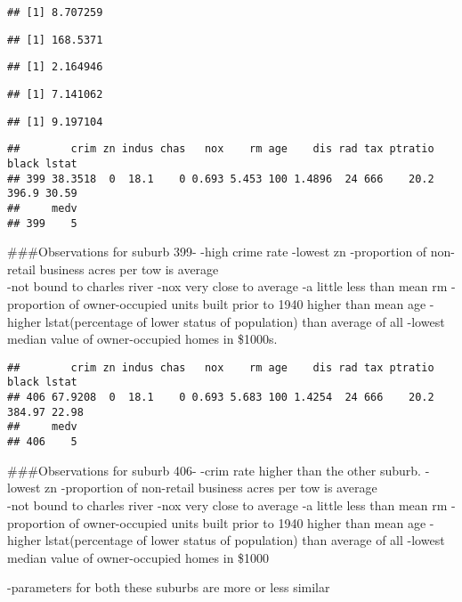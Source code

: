 \documentclass[
]{article}
\begin{document}
\begin{verbatim}
## [1] 8.707259
\end{verbatim}

\begin{verbatim}
## [1] 168.5371
\end{verbatim}

\begin{verbatim}
## [1] 2.164946
\end{verbatim}

\begin{verbatim}
## [1] 7.141062
\end{verbatim}

\begin{verbatim}
## [1] 9.197104
\end{verbatim}

\begin{verbatim}
##        crim zn indus chas   nox    rm age    dis rad tax ptratio black lstat
## 399 38.3518  0  18.1    0 0.693 5.453 100 1.4896  24 666    20.2 396.9 30.59
##     medv
## 399    5
\end{verbatim}

\#\#\#Observations for suburb 399- -high crime rate -lowest zn
-proportion of non-retail business acres per tow is average\\
-not bound to charles river -nox very close to average -a little less
than mean rm -proportion of owner-occupied units built prior to 1940
higher than mean age -higher lstat(percentage of lower status of
population) than average of all -lowest median value of owner-occupied
homes in \$1000s.

\begin{verbatim}
##        crim zn indus chas   nox    rm age    dis rad tax ptratio  black lstat
## 406 67.9208  0  18.1    0 0.693 5.683 100 1.4254  24 666    20.2 384.97 22.98
##     medv
## 406    5
\end{verbatim}

\#\#\#Observations for suburb 406- -crim rate higher than the other
suburb. -lowest zn -proportion of non-retail business acres per tow is
average\\
-not bound to charles river -nox very close to average -a little less
than mean rm -proportion of owner-occupied units built prior to 1940
higher than mean age -higher lstat(percentage of lower status of
population) than average of all -lowest median value of owner-occupied
homes in \$1000

-parameters for both these suburbs are more or less similar
\end{document}
